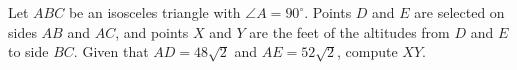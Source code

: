 Let $ABC$ be an isosceles triangle with $\angle A = 90^{\circ}$. Points $D$ and $E$ are selected on sides $AB$ and $AC$, and points $X$ and $Y$ are the feet of the altitudes from $D$ and $E$ to side $BC$.  Given that $AD = 48\sqrt2$ and $AE = 52\sqrt2$, compute $XY$.

